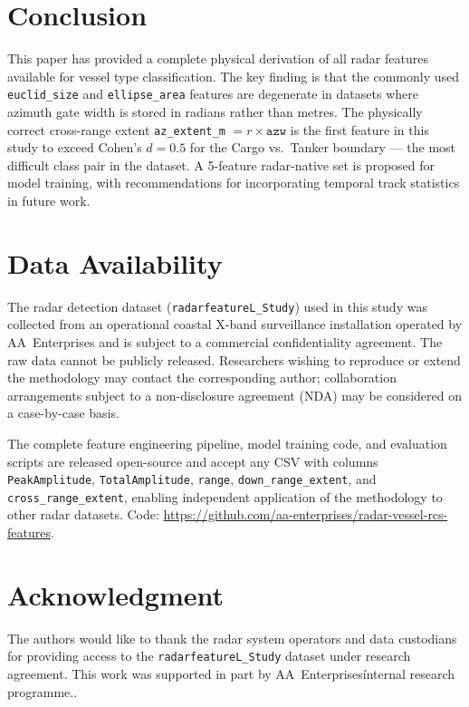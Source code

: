 \documentclass[journal]{IEEEtran}
\begin{document}
\section{Conclusion}

This paper has provided a complete physical derivation of all radar features
available for vessel type classification. The key finding is that the commonly
used \texttt{euclid\_size} and \texttt{ellipse\_area} features are degenerate
in datasets where azimuth gate width is stored in radians rather than metres.
The physically correct cross-range extent \texttt{az\_extent\_m} $= r \times \texttt{azw}$
is the first feature in this study to exceed Cohen's $d = 0.5$ for the
Cargo vs.\ Tanker boundary — the most difficult class pair in the dataset.
A 5-feature radar-native set is proposed for model training, with recommendations
for incorporating temporal track statistics in future work.

\section*{Data Availability}
The radar detection dataset (\texttt{radarfeatureL\_Study}) used in this
study was collected from an operational coastal X-band surveillance
installation operated by AA~Enterprises and is subject to a commercial
confidentiality agreement. The raw data cannot be publicly released.
Researchers wishing to reproduce or extend the methodology may contact
the corresponding author; collaboration arrangements subject to a
non-disclosure agreement (NDA) may be considered on a case-by-case basis.

The complete feature engineering pipeline, model training code, and
evaluation scripts are released open-source and accept any CSV with
columns \texttt{PeakAmplitude}, \texttt{TotalAmplitude}, \texttt{range},
\texttt{down\_range\_extent}, and \texttt{cross\_range\_extent}, enabling
independent application of the methodology to other radar datasets.
Code: \url{https://github.com/aa-enterprises/radar-vessel-rcs-features}.

\section*{Acknowledgment}
The authors would like to thank the radar system operators and data custodians for providing access to the \texttt{radarfeatureL\_Study} dataset under research agreement. This work was supported in part by AA~Enterprises\' internal research programme..
\end{document}
